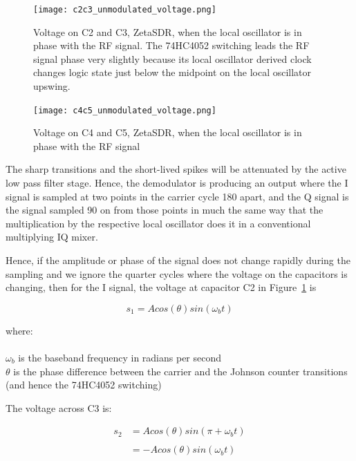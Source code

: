 \documentclass[11pt, twoside]{article}
\begin{document}
\begin{figure}
  \center
  \captionsetup{width=.8\linewidth}
  \texttt{[image: c2c3\_unmodulated\_voltage.png]}
  \caption{Voltage on C2 and C3, ZetaSDR, when the local oscillator is
    in phase with the RF signal. The 74HC4052 switching leads the RF
    signal phase very slightly because its local oscillator derived
    clock changes logic state just below the midpoint on the local
    oscillator upswing.}
  \label{figure:C2C3simple}
\end{figure}


\begin{figure}
  \center
  \captionsetup{width=.8\linewidth}
  \texttt{[image: c4c5\_unmodulated\_voltage.png]}
  \caption{Voltage on C4 and C5, ZetaSDR, when the local oscillator is
    in phase with the RF signal}
  \label{figure:C4C5simple}
\end{figure}

The sharp transitions and the short-lived spikes will be attenuated by
the active low pass filter stage.  Hence, the demodulator is producing
an output where the I signal is sampled at two points in the carrier
cycle 180{\degree} apart, and the Q signal is the signal sampled
90{\degree} on from those points in much the same way that the
multiplication by the respective local oscillator does it in a
conventional multiplying IQ mixer.

Hence, if the amplitude or phase of the signal does not change rapidly
during the sampling and we ignore the quarter cycles where the voltage
on the capacitors is changing, then for the I signal, the voltage at
capacitor C2 in Figure~\ref{figure:C2C3simple} is

\begin{equation*}
  s_1 = A cos(\theta) sin({\omega_b}t)
\end{equation*}

where:\\
\\
  ${\omega_b}$ is the baseband frequency in radians per second\\

$\theta$ is the phase difference between the carrier and the Johnson
counter transitions (and hence the 74HC4052 switching)

The voltage across C3 is:

\begin{align*}
  s_2 & = A cos(\theta) sin(\pi + {\omega_b}t) \\
  \\
  &= -A cos(\theta) sin({\omega_b}t)
\end{align*}
\end{document}
